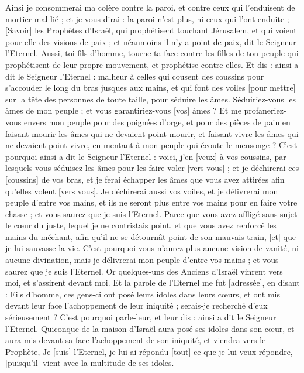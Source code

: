 \begin{multicols}{2}
Ainsi je consommerai ma colère contre la paroi, et contre ceux qui l'enduisent de mortier mal lié ; et je vous dirai : la paroi n'est plus, ni ceux qui l'ont enduite ;
[Savoir] les Prophètes d'Israël, qui prophétisent touchant Jérusalem, et qui voient pour elle des visions de paix ; et néanmoins il n'y a point de paix, dit le Seigneur l'Eternel.
Aussi, toi fils d'homme, tourne ta face contre les filles de ton peuple qui prophétisent de leur propre mouvement, et prophétise contre elles.
Et dis : ainsi a dit le Seigneur l'Eternel : malheur à celles qui cousent des coussins pour s'accouder le long du bras jusques aux mains, et qui font des voiles [pour mettre] sur la tête des personnes de toute taille, pour séduire les âmes. Séduiriez-vous les âmes de mon peuple ; et vous garantiriez-vous [vos] âmes ?
Et me profaneriez-vous envers mon peuple pour des poignées d'orge, et pour des pièces de pain en faisant mourir les âmes qui ne devaient point mourir, et faisant vivre les âmes qui ne devaient point vivre, en mentant à mon peuple qui écoute le mensonge ?
C'est pourquoi ainsi a dit le Seigneur l'Eternel : voici, j'en [veux] à vos coussins, par lesquels vous séduisez les âmes pour les faire voler [vers vous] ; et je déchirerai ces [coussins] de vos bras, et je ferai échapper les âmes que vous avez attirées afin qu'elles volent [vers vous].
Je déchirerai aussi vos voiles, et je délivrerai mon peuple d'entre vos mains, et ils ne seront plus entre vos mains pour en faire votre chasse ; et vous saurez que je suis l'Eternel.
Parce que vous avez affligé sans sujet le cœur du juste, lequel je ne contristais point, et que vous avez renforcé les mains du méchant, afin qu'il ne se détournât point de son mauvais train, [et] que je lui sauvasse la vie.
C'est pourquoi vous n'aurez plus aucune vision de vanité, ni aucune divination, mais je délivrerai mon peuple d'entre vos mains ; et vous saurez que je suis l'Eternel.
\VerseOne{}Or quelques-uns des Anciens d'Israël vinrent vers moi, et s'assirent devant moi.
Et la parole de l'Eternel me fut [adressée], en disant :
Fils d'homme, ces gens-ci ont posé leurs idoles dans leurs cœurs, et ont mis devant leur face l'achoppement de leur iniquité ; serais-je recherché d'eux sérieusement ?
C'est pourquoi parle-leur, et leur dis : ainsi a dit le Seigneur l'Eternel. Quiconque de la maison d'Israël aura posé ses idoles dans son cœur, et aura mis devant sa face l'achoppement de son iniquité, et viendra vers le Prophète, Je [suis] l'Eternel, je lui ai répondu [tout] ce que je lui veux répondre, [puisqu'il] vient avec la multitude de ses idoles.

\end{multicols}
